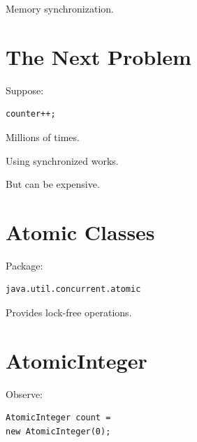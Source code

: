 \documentclass[11pt,a4paper]{book}
\begin{document}

Memory synchronization.


\section{The Next Problem}

Suppose:

\begin{verbatim} 
counter++;
\end{verbatim}


Millions of times.


Using synchronized works.


But can be expensive.


\section{Atomic Classes}

Package:

\begin{verbatim} 
java.util.concurrent.atomic
\end{verbatim}


Provides lock-free operations.


\section{AtomicInteger}

Observe:

\begin{verbatim} 
AtomicInteger count =
new AtomicInteger(0);
\end{verbatim}

\end{document}
